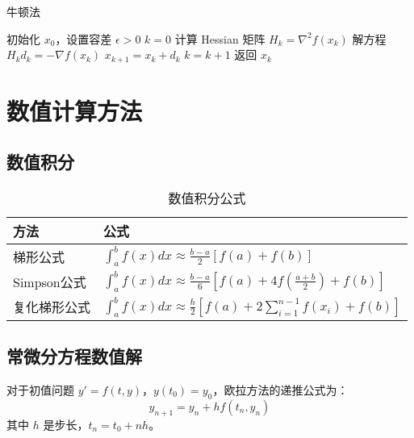 \begin{algorithm}[H]
\caption{牛顿法}\label{alg:newton-method}
\begin{algorithmic}[1]
\State 初始化 $x_0$，设置容差 $\epsilon > 0$
\State $k = 0$
    \State 计算 Hessian 矩阵 $H_k = \nabla^2 f(x_k)$
    \State 解方程 $H_k d_k = -\nabla f(x_k)$
    \State $x_{k+1} = x_k + d_k$
    \State $k = k + 1$
\EndWhile
\State 返回 $x_k$
\end{algorithmic}
\end{algorithm}

\section{数值计算方法}\label{app:numerical-methods}

\subsection{数值积分}

\begin{table}[htbp]
    \centering
    \caption{数值积分公式}
    \label{tab:numerical-integration}
    \begin{tabular}{@{}ll@{}}
        \toprule
        方法 & 公式 \\
        \midrule
        梯形公式 & $\int_a^b f(x) dx \approx \frac{b-a}{2}[f(a) + f(b)]$ \\
        Simpson公式 & $\int_a^b f(x) dx \approx \frac{b-a}{6}[f(a) + 4f(\frac{a+b}{2}) + f(b)]$ \\
        复化梯形公式 & $\int_a^b f(x) dx \approx \frac{h}{2}[f(a) + 2\sum_{i=1}^{n-1}f(x_i) + f(b)]$ \\
        \bottomrule
    \end{tabular}
\end{table}

\subsection{常微分方程数值解}

\begin{examplebox}[title=欧拉方法]
对于初值问题 $y' = f(t, y)$，$y(t_0) = y_0$，欧拉方法的递推公式为：
\[
y_{n+1} = y_n + h f(t_n, y_n)
\]
其中 $h$ 是步长，$t_n = t_0 + nh$。
\end{examplebox}

